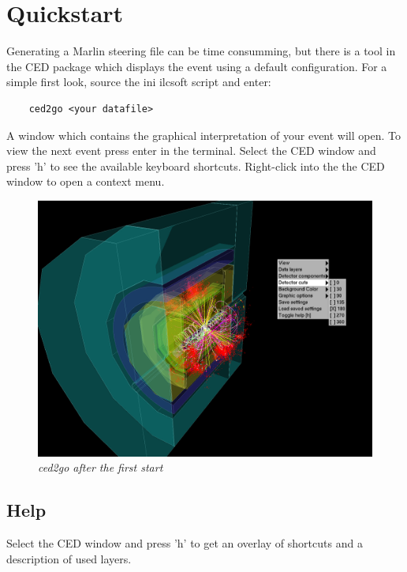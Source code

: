 \documentclass[a4paper,10pt]{article}
\begin{document}
\section{Quickstart}
Generating a Marlin steering file can be time consumming, but there is a tool in the CED package which displays the event using a default configuration. For a simple first look, source the ini ilcsoft script and enter: 
\begin{verbatim}
    ced2go <your datafile>
\end{verbatim}
A window which contains the graphical interpretation of your event will open. To view the next event press enter in the terminal.
\newline\newline
Select the CED window and press 'h' to see the available keyboard shortcuts. Right-click into the the CED window to open a context menu.

\begin{figure}[h]
\centerline{ \includegraphics[width=1\linewidth]{quickstart6.png}}
\caption{\label{CEDViewer} \textsl{ced2go after the first start}}
\end{figure}


\subsection{Help}
Select the CED window and press 'h' to get an overlay of shortcuts and a description of used layers.
\end{document}
